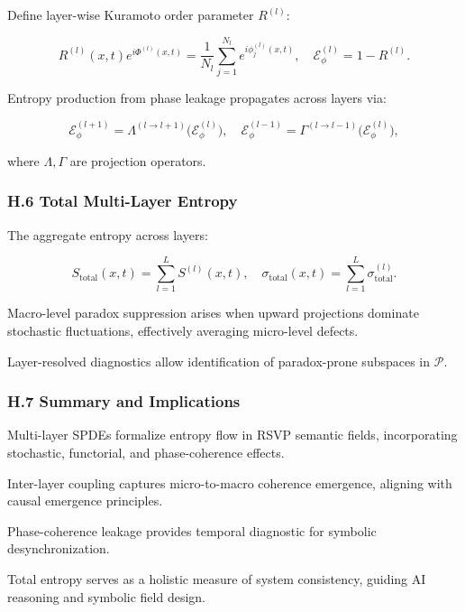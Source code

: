\documentclass[12pt]{article}
\theoremstyle{plain}
\begin{document}
Define layer-wise Kuramoto order parameter \(R^{(l)}\):

\begin{equation}
R^{(l)}(x,t) e^{i\Phi^{(l)}(x,t)} = \frac{1}{N_l} \sum_{j=1}^{N_l} e^{i\phi_j^{(l)}(x,t)}, \quad \mathcal{E}_\phi^{(l)} = 1 - R^{(l)}.
\end{equation}

Entropy production from phase leakage propagates across layers via:

\begin{equation}
\mathcal{E}_\phi^{(l+1)} = \Lambda^{(l \to l+1)}\big(\mathcal{E}_\phi^{(l)}\big), \quad \mathcal{E}_\phi^{(l-1)} = \Gamma^{(l \to l-1)}\big(\mathcal{E}_\phi^{(l)}\big),
\end{equation}

where \(\Lambda, \Gamma\) are projection operators.

\subsubsection*{H.6 Total Multi-Layer Entropy}

The aggregate entropy across layers:

\begin{equation}
S_{\mathrm{total}}(x,t) = \sum_{l=1}^L S^{(l)}(x,t), \quad \sigma_{\mathrm{total}}(x,t) = \sum_{l=1}^L \sigma^{(l)}_{\mathrm{total}}.
\end{equation}

Macro-level paradox suppression arises when upward projections dominate stochastic fluctuations, effectively averaging micro-level defects.

Layer-resolved diagnostics allow identification of paradox-prone subspaces in \(\mathcal{P}\).

\subsubsection*{H.7 Summary and Implications}

Multi-layer SPDEs formalize entropy flow in RSVP semantic fields, incorporating stochastic, functorial, and phase-coherence effects.

Inter-layer coupling captures micro-to-macro coherence emergence, aligning with causal emergence principles.

Phase-coherence leakage provides temporal diagnostic for symbolic desynchronization.

Total entropy serves as a holistic measure of system consistency, guiding AI reasoning and symbolic field design.
\end{document}
